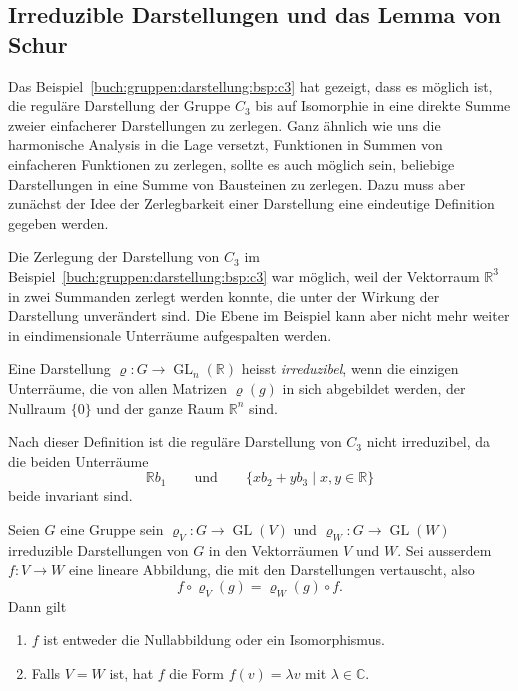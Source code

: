 %
%
%

%
%
\subsection{Irreduzible Darstellungen und das Lemma von Schur}
Das Beispiel~\ref{buch:gruppen:darstellung:bsp:c3} hat gezeigt, dass
es möglich ist, die reguläre Darstellung der Gruppe $C_3$ bis auf
Isomorphie in eine direkte Summe zweier einfacherer Darstellungen
zu zerlegen.
Ganz ähnlich wie uns die harmonische Analysis in die Lage versetzt,
Funktionen in Summen von einfacheren Funktionen zu zerlegen, sollte
es auch möglich sein, beliebige Darstellungen in eine Summe von
Bausteinen zu zerlegen.
Dazu muss aber zunächst der Idee der Zerlegbarkeit einer Darstellung
eine eindeutige Definition gegeben werden.

Die Zerlegung der Darstellung von $C_3$ im 
Beispiel~\ref{buch:gruppen:darstellung:bsp:c3} war möglich, weil
der Vektorraum $\mathbb{R}^3$ in zwei Summanden zerlegt werden 
konnte, die unter der Wirkung der Darstellung unverändert sind.
Die Ebene im Beispiel kann aber nicht mehr weiter in eindimensionale
Unterräume aufgespalten werden.

\begin{definition}
\label{buch:gruppen:darstellung:def:irreduzibel}
Eine Darstellung $\varrho\colon G\to \operatorname{GL}_n(\mathbb{R})$ 
heisst {\em irreduzibel}, wenn die einzigen Unterräume, die von allen
Matrizen $\varrho(g)$ in sich abgebildet werden, der Nullraum $\{0\}$
und der ganze Raum $\mathbb{R}^n$ sind.
\end{definition}

Nach dieser Definition ist die reguläre Darstellung von $C_3$ nicht
irreduzibel, da die beiden Unterräume
\[
\mathbb{R}b_1%
\qquad\text{und}\qquad
\{
xb_2 + yb_3
\mid
x,y\in\mathbb{R}
\}
\]
beide invariant sind.

\begin{satz}
\label{buch:gruppen:darstellung:satz:lemmavonschur}
Seien $G$ eine Gruppe sein $\varrho_V\colon G\to \operatorname{GL}(V)$
und $\varrho_W\colon G\to\operatorname{GL}(W)$ irreduzible Darstellungen
von $G$ in den Vektorräumen $V$ und $W$.
Sei ausserdem $f\colon V\to W$ eine lineare Abbildung, die mit den
Darstellungen vertauscht, also
\begin{equation}
f\circ \varrho_V(g) = \varrho_W(g)\circ f.
\label{buch:gruppen:darstellung:eqn:schur}
\end{equation}
Dann gilt
\begin{enumerate}
\item $f$ ist entweder die Nullabbildung oder ein Isomorphismus.
\item Falls $V=W$ ist, hat $f$ die Form $f(v)=\lambda v$ mit
$\lambda\in \mathbb{C}$.
\end{enumerate}
\end{satz}

